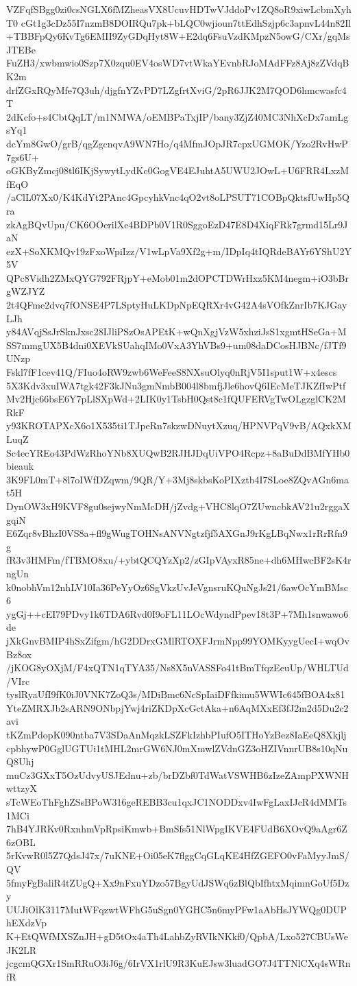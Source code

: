 VZFqfSBgg0zi0csNGLX6fMZheasVX8UcuvHDTwVJddoPv1ZQ8oR9xiwLcbmXyhT0
cGt1g3cDz55I7nzmB8DOIRQu7pk+bLQC0wjioun7ttEdhSzjp6c3apnvL44n82Il
+TBBFpQy6KvTg6EMII9ZyGDqHyt8W+E2dq6FsuVzdKMpzN5owG/CXr/gqMsJTEBe
FuZH3/xwbmwio0Szp7X0zqu0EV4osWD7vtWkaYEvnbRJoMAdFFz8Aj8zZVdqBK2m
drfZGxRQyMfe7Q3uh/djgfnYZvPD7LZgfrtXviG/2pR6JJK2M7QOD6hmcwasfc4T
2dKcfo+s4CbtQqLT/m1NMWA/oEMBPaTxjIP/bany3ZjZ40MC3NhXcDx7amLgsYq1
dcYm8GwO/grB/qgZgcnqvA9WN7Ho/q4MfmJOpJR7cpxUGMOK/Yzo2RvHwP7gs6U+
oGKByZmcj08tl6IKjSywytLydKc0GogVE4EJuhtA5UWU2JOwL+U6FRR4LxzMfEqO
/aClL07Xx0/K4KdYt2PAnc4GpcyhkVnc4qO2vt8oLPSUT71COBpQktsfUwHp5Qra
zkAgBQvUpu/CK6OOerilXe4BDPb0V1R0SggoEzD47E8D4XiqFRk7grmd15Lr9JaN
ezX+SoXKMQv19zFxoWpiIzz/V1wLpVa9Xf2g+m/IDpIq4tIQRdeBAYr6YShU2Y5V
QPc8Vidh2ZMxQYG792FRjpY+eMob01m2dOPCTDWrHxz5KM4negm+iO3bBrgWZJYZ
2t4QFme2dvq7fONSE4P7LSptyHuLKDpNpEQRXr4vG42A4sVOfkZnrIb7KJGayLJh
y84AVqjSsJrSknJxsc28IJliPSzOsAPEtK+wQnXgjVzW5xhziJsS1xgmtHSeGa+M
SS7mmgUX5B4dni0XEVkSUahqIMo0VxA3YhVBs9+um08daDCosHJBNc/fJTf9UNzp
Fskl7fF1cev41Q/FIuo4oRW9zwb6WeFeeS8NXsuOlyq0nRjV5I1sput1W+x4escs
5X3Kdv3xuIWA7tgk42F3kJNu3gmNmbB004l8bmfjJle6hovQ6IEcMeTJKZfIwPtf
Mv2Hjc66bsE6Y7pLlSXpWd+2LIK0y1TsbH0Qst8c1fQUFERVgTwOLgzglCK2MRkF
y93KROTAPXcX6o1X535ti1TJpeRn7skzwDNuytXzuq/HPNVPqV9vB/AQxkXMLuqZ
Sc4ecYREo43PdWzRhoYNb8XUQwB2RJHJDqUiVPO4Rcpz+8aBuDdBMfYHb0bieauk
3K9FL0mT+8l7oIWfDZqwm/9QR/Y+3Mj8skbsKoPIXztb4I7SLoe8ZQvAGn6mat5H
DynOW3xH9KVF8gu0sejwyNmMcDH/jZvdg+VHC8lqO7ZUwncbkAV21u2rggaXgqiN
E6Zqr8vBhzI0VS8a+fl9gWugTOHNsANVNgtzfjf5AXGnJ9rKgLBqNwx1rRrRfn9g
fR3v3HMFm/fTBMO8xu/+ybtQCQYzXp2/zGIpVAyxR85ne+dh6MHwcBF2sK4rngUn
k0nobhVm12nhLV10Ia36PeYyOz6SgVkzUvJeVgnsruKQuNgJs21/6awOcYmBMsc6
ygGj++cEI79PDvy1k6TDA6Rvd0I9oFL11LOcWdyndPpev18t3P+7Mh1snwawo6de
jXkGnvBMIP4hSxZifgm/hG2DDrxGMlRTOXFJrmNpp99YOMKyygUecI+wqOvBz8ox
/jKOG8yOXjM/F4xQTN1qTYA35/Ns8X5nVASSFo41tBmTfqzEeuUp/WHLTUd/VIrc
tyslRyaUfI9fK0iJ0VNK7ZoQ3s/MDiBmc6NcSpIaiDFfkimu5WWIc645fBOA4x81
YteZMRXJb2sARN9ONbpjYwj4riZKDpXcGctAka+n6AqMXxEf3fJ2m2d5Du2c2avi
tKZmPdopK090ntba7V3SDaAnMqzkLSZFkIzhbPIufO5ITHoYzBez8IaEeQ8Xkjlj
cpbhywP0GglUGTUi1tMHL2mrGW6NJ0mXmwlZVdnGZ3oHZIVnnrUB8s10qNuQ8Uhj
muCz3GXxT5OzUdvyUSJEdnu+zb/brDZbf0TdWatVSWHB6zIzeZAmpPXWNHwttzyX
sTcWEoThFghZSsBPoW316geREBB3cu1qxJC1NODDxv4IwFgLaxIJcR4dMMTs1MCi
7hB4YJRKv0RxnhmVpRpsiKmwb+BmSfs51NlWpgIKVE4FUdB6XOvQ9aAgr6Z6zOBL
5rKvwR0l5Z7QdsJ47x/7uKNE+Oi05eK7flggCqGLqKE4HfZGEFO0vFaMyyJmS/QV
5fmyFgBaliR4tZUgQ+Xx9nFxuYDzo57BgyUdJSWq6zBlQbIfhtxMqimnGoUf5Dzy
UUJiOlK3117MutWFqzwtWFhG5uSgn0YGHC5n6myPFw1aAbHsJYWQg0DUPhEXdzVp
K+EtQWfMXSZnJH+gD5tOx4aTh4LahbZyRVIkNKkf0/QpbA/Lxo527CBUsWeJK2LR
jcgcmQGXr1SmRRuO3iJ6g/6IrVX1rlU9R3KuEJsw3luadGO7J4TTNlCXq4sWRnfR
